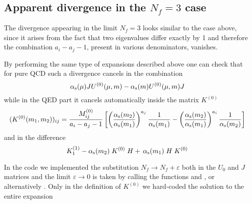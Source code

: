 \subsection{Apparent divergence in the $N_f=3$ case}

The divergence appearing in the limit $N_f=3$ looks similar to the case above, since
it arises from the fact that two eigenvalues differ exactly by 1 and therefore
the combination $a_i -a_j -1$, present in various denominators, vanishes.

By performing the same type of expansions described above one can check that for pure QCD
such a divergence cancels in the combination
\[ \alpha_{\rm s}(\mu) J U^{(0)}(\mu,m) - \alpha_{\rm s}(m) U^{(0)}(\mu,m) J \]
while in the QED part it cancels automatically inside the matrix $K^{(0)}$
\begin{equation}
(K^{(0)}(m_1,m_2))_{ij} = \frac{M^{(0)}_{ij}}{a_i - a_j - 1}
\left[
\left( \frac{\alpha_{\rm s}(m_2)}{\alpha_{\rm s}(m_1)} \right)^{a_j} \frac{1}{\alpha_{\rm s}(m_1)} -
\left( \frac{\alpha_{\rm s}(m_2)}{\alpha_{\rm s}(m_1)} \right)^{a_i} \frac{1}{\alpha_{\rm s}(m_2)}
\right] 
\label{eq:K0}
\end{equation}
and in the difference
\begin{equation}
K_1^{(1)} - \alpha_{\rm s}(m_2) \; K^{(0)} \; H + \,\alpha_{\rm s}(m_1) \; H \; K^{(0)}
\end{equation}

In the code we implemented the substitution $N_f \to N_f + \varepsilon$ both in the 
$U_0$ and $J$ matrices and the limit $\varepsilon \to 0$ is taken by calling the functions 
 and , or alternatively . 
Only in the definition of $K^{(0)}$ we hard-coded the solution to the entire expansion


